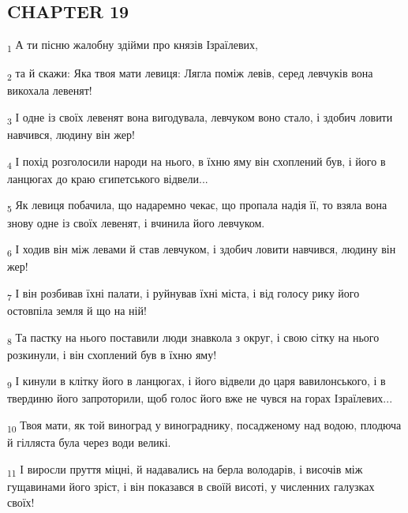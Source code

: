 \subsection{CHAPTER 19}
\begin{tcolorbox}
\textsubscript{1} А ти пісню жалобну здійми про князів Ізраїлевих,
\end{tcolorbox}
\begin{tcolorbox}
\textsubscript{2} та й скажи: Яка твоя мати левиця: Лягла поміж левів, серед левчуків вона викохала левенят!
\end{tcolorbox}
\begin{tcolorbox}
\textsubscript{3} І одне із своїх левенят вона вигодувала, левчуком воно стало, і здобич ловити навчився, людину він жер!
\end{tcolorbox}
\begin{tcolorbox}
\textsubscript{4} І похід розголосили народи на нього, в їхню яму він схоплений був, і його в ланцюгах до краю єгипетського відвели...
\end{tcolorbox}
\begin{tcolorbox}
\textsubscript{5} Як левиця побачила, що надаремно чекає, що пропала надія її, то взяла вона знову одне із своїх левенят, і вчинила його левчуком.
\end{tcolorbox}
\begin{tcolorbox}
\textsubscript{6} І ходив він між левами й став левчуком, і здобич ловити навчився, людину він жер!
\end{tcolorbox}
\begin{tcolorbox}
\textsubscript{7} І він розбивав їхні палати, і руйнував їхні міста, і від голосу рику його остовпіла земля й що на ній!
\end{tcolorbox}
\begin{tcolorbox}
\textsubscript{8} Та пастку на нього поставили люди знавкола з округ, і свою сітку на нього розкинули, і він схоплений був в їхню яму!
\end{tcolorbox}
\begin{tcolorbox}
\textsubscript{9} І кинули в клітку його в ланцюгах, і його відвели до царя вавилонського, і в твердиню його запроторили, щоб голос його вже не чувся на горах Ізраїлевих...
\end{tcolorbox}
\begin{tcolorbox}
\textsubscript{10} Твоя мати, як той виноград у винограднику, посадженому над водою, плодюча й гілляста була через води великі.
\end{tcolorbox}
\begin{tcolorbox}
\textsubscript{11} І виросли пруття міцні, й надавались на берла володарів, і височів між гущавинами його зріст, і він показався в своїй висоті, у численних галузках своїх!
\end{tcolorbox}
